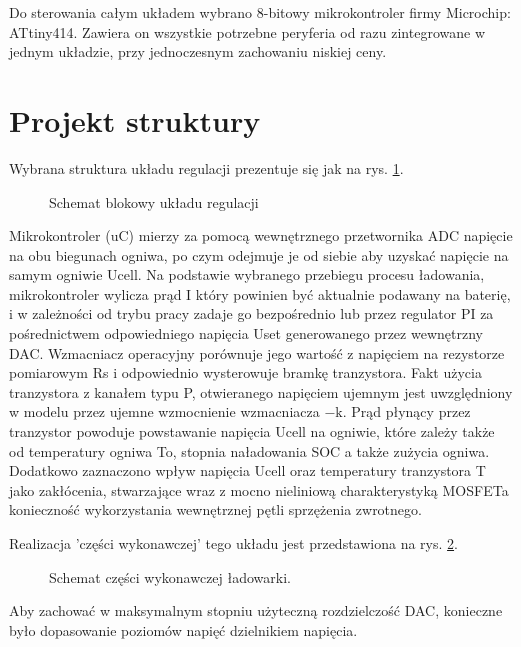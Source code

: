 \documentclass[polish,engineer]{polsl-msth}
\begin{document}
Do sterowania całym układem wybrano 8-bitowy mikrokontroler firmy Microchip: ATtiny414. Zawiera on wszystkie potrzebne peryferia od razu zintegrowane w jednym układzie, przy jednoczesnym zachowaniu niskiej ceny. 
\section{Projekt struktury}
Wybrana struktura układu regulacji prezentuje się jak na rys. \ref{dia:reg_all}. 
\begin{figure}
     \resizebox{\linewidth}{!}{}
     \caption{Schemat blokowy układu regulacji\label{dia:reg_all}}
\end{figure}

Mikrokontroler (uC) mierzy za pomocą wewnętrznego przetwornika ADC napięcie na obu biegunach ogniwa, po czym odejmuje je od siebie aby uzyskać napięcie na samym ogniwie Ucell. Na podstawie wybranego przebiegu procesu ładowania, mikrokontroler wylicza prąd I który powinien być aktualnie podawany na baterię, i w zależności od trybu pracy zadaje go bezpośrednio lub przez regulator PI za pośrednictwem odpowiedniego napięcia Uset generowanego przez wewnętrzny DAC. Wzmacniacz operacyjny porównuje jego wartość z napięciem na rezystorze pomiarowym Rs i odpowiednio wysterowuje bramkę tranzystora. Fakt użycia tranzystora z kanałem typu P, otwieranego napięciem ujemnym jest uwzględniony w modelu przez ujemne wzmocnienie wzmacniacza $\mathrm{-k}$. Prąd płynący przez tranzystor powoduje powstawanie napięcia Ucell na ogniwie, które zależy także od temperatury ogniwa To, stopnia naładowania SOC a także zużycia ogniwa. Dodatkowo zaznaczono wpływ napięcia Ucell oraz temperatury tranzystora T jako zakłócenia, stwarzające wraz z mocno nieliniową charakterystyką MOSFETa konieczność wykorzystania wewnętrznej pętli sprzężenia zwrotnego.

Realizacja 'części wykonawczej' tego układu jest przedstawiona na rys. \ref{img:charging_circuit}. 
\begin{figure}[hbtp]
     \caption{Schemat części wykonawczej ładowarki. \label{img:charging_circuit}}
\end{figure}
Aby zachować w maksymalnym stopniu użyteczną rozdzielczość DAC, konieczne było dopasowanie poziomów napięć dzielnikiem napięcia.
\end{document}
